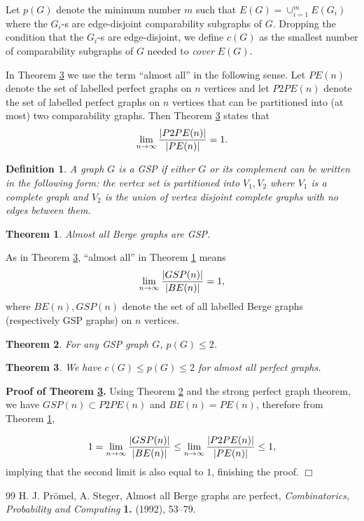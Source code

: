 \documentclass[12pt]{article}
\newtheorem{theorem}{Theorem}%
\newtheorem{definition}{Definition}
\def\qed{\ifhmode\unskip\nobreak\fi\quad\ifmmode\Box\else$\Box$\fi}
\def\qed{\hfill $\Box$}
\begin{document}
Let $p(G)$ denote the minimum number $m$ such that $E(G)=\cup_{i=1}^m E(G_i)$ where the $G_i$-s are edge-disjoint comparability subgraphs of $G$.
Dropping  the condition that the $G_i$-s are edge-disjoint, we define $c(G)$ as the smallest number of comparability subgraphs of $G$ needed to {\em cover} $E(G)$.

In Theorem \ref{twocover} we use the term ``almost all'' in the following sense.
Let $PE(n)$ denote the set of labelled perfect graphs on $n$ vertices and let $P2PE(n)$ denote the
set of labelled perfect graphs on $n$ vertices that can be partitioned into (at most) two comparability graphs.
Then  Theorem \ref{twocover} states that
$$\lim_{n\rightarrow \infty} {|P2PE(n)|\over |PE(n)|}=1.$$

\begin{definition} A graph $G$ is a GSP if either $G$ or its complement can be written in the following form:
  the vertex set is partitioned into $V_1,V_2$ where $V_1$ is a complete graph and $V_2$ is the union of vertex disjoint complete graphs with no edges between them.
\end{definition}

\begin{theorem}\label{promelsteger}\cite{PS} Almost all Berge graphs are GSP.
\end{theorem}

As in Theorem \ref{twocover}, ``almost all'' in Theorem \ref{promelsteger} means
$$\lim_{n\rightarrow \infty} { |GSP(n)|\over|BE(n)|}=1,$$
where $BE(n),GSP(n)$ denote the set of all labelled Berge graphs (respectively GSP graphs) on $n$ vertices.

\begin{theorem} \label{gensplit} For any GSP graph $G$, $p(G)\le 2$.
\end{theorem}

\begin{theorem} \label{twocover} We have $c(G)\le p(G)\le 2$ for almost all perfect graphs.
\end{theorem}

{\bf Proof of Theorem \ref{twocover}.} Using Theorem  \ref{gensplit} and the strong perfect graph theorem, we have
$GSP(n)\subset P2PE(n)$ and $BE(n)=PE(n)$, therefore from Theorem \ref{promelsteger},

$$1=\lim_{n\rightarrow \infty} {|GSP(n)|\over |BE(n)|}\le \lim_{n\rightarrow \infty}{|P2PE(n)|\over |PE(n)|}\le 1,$$
implying that the second limit is also equal to $1$, finishing the proof. \qed

\begin{thebibliography}{99}
 H. J. Pr\"omel, A. Steger, Almost all Berge graphs are perfect, {\em Combinatorics, Probability and Computing} {\bf 1.} (1992), 53--79.
\end{thebibliography}
\end{document}
